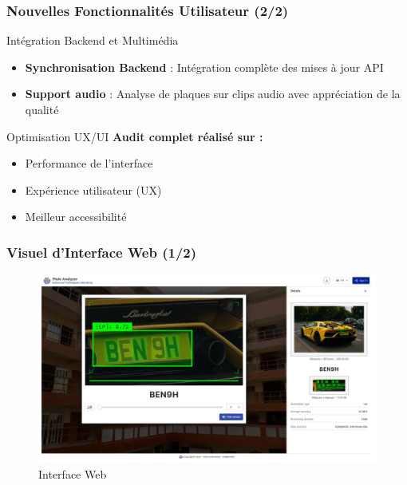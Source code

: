 \documentclass[
	11pt,
	aspectratio=169,
]{beamer}
\begin{document}
\begin{frame}
	\frametitle{Nouvelles Fonctionnalités Utilisateur (2/2)}
	
	\begin{block}{Intégration Backend et Multimédia}
		\begin{itemize}
			\item \textbf{Synchronisation Backend} : Intégration complète des mises à jour API
			\item \textbf{Support audio} : Analyse de plaques sur clips audio avec appréciation de la qualité
		\end{itemize}
	\end{block}
	
	\bigskip
	
	\begin{exampleblock}{Optimisation UX/UI}
		\textbf{Audit complet réalisé sur :}
		\begin{itemize}
			\item Performance de l'interface
			\item Expérience utilisateur (UX)
			\item Meilleur accessibilité
		\end{itemize}
	\end{exampleblock}
\end{frame}


\begin{frame}
	\frametitle{Visuel d'Interface Web (1/2)}
	
	\begin{figure}
		\includegraphics[width=0.9\linewidth]{Images/image1.png}
		\caption{Interface Web}
	\end{figure}
\end{frame}

\end{document}
